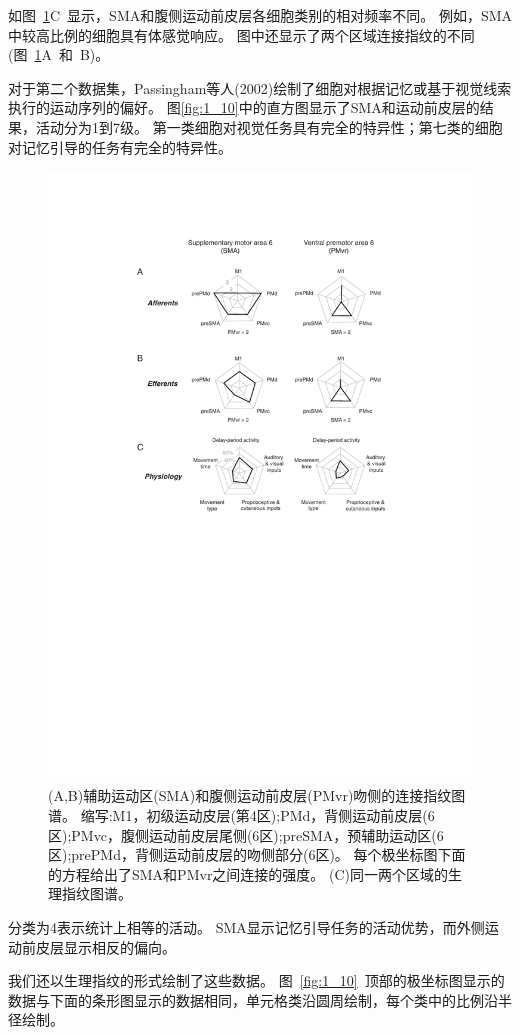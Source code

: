 \par
如图~\ref{fig:1_9}C~显示，SMA和腹侧运动前皮层各细胞类别的相对频率不同。
例如，SMA中较高比例的细胞具有体感觉响应。
图中还显示了两个区域连接指纹的不同(图~\ref{fig:1_9}A~和~B)。
\par
对于第二个数据集，Passingham等人(2002)绘制了细胞对根据记忆或基于视觉线索执行的运动序列的偏好\cite{2002Dorsal,mushiake1991neuronal}。
图\ref{fig:1_10}中的直方图显示了SMA和运动前皮层的结果，活动分为1到7级。
第一类细胞对视觉任务具有完全的特异性；第七类的细胞对记忆引导的任务有完全的特异性。


\begin{figure}[!htb]
	\centering
	\includegraphics[width=0.8\linewidth]{chap1/1_9}
	\caption{(A,B)辅助运动区(SMA)和腹侧运动前皮层(PMvr)吻侧的连接指纹图谱。
		缩写:M1，初级运动皮层(第4区);PMd，背侧运动前皮层(6区);PMvc，腹侧运动前皮层尾侧(6区);preSMA，预辅助运动区(6区);prePMd，背侧运动前皮层的吻侧部分(6区)。
		每个极坐标图下面的方程给出了SMA和PMvr之间连接的强度。
		(C)同一两个区域的生理指纹图谱\cite{passingham2002anatomical}。	\label{fig:1_9}}
\end{figure}


\par
分类为4表示统计上相等的活动。
SMA显示记忆引导任务的活动优势，而外侧运动前皮层显示相反的偏向。
\par
我们还以生理指纹的形式绘制了这些数据。
图~\ref{fig:1_10}~顶部的极坐标图显示的数据与下面的条形图显示的数据相同，单元格类沿圆周绘制，每个类中的比例沿半径绘制。


